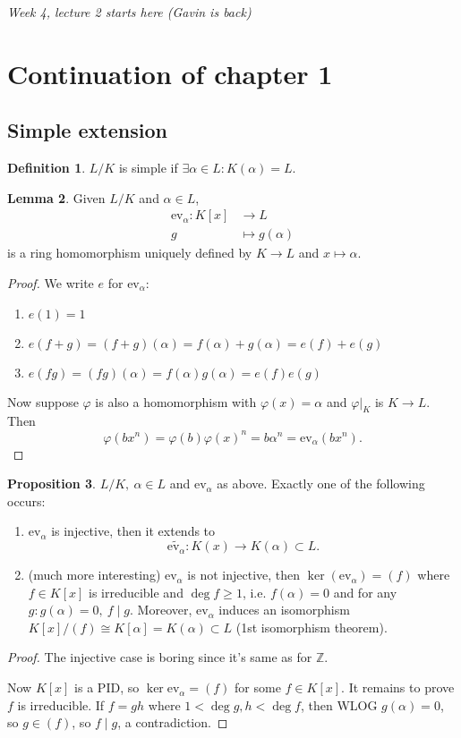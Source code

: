 \documentclass[a4paper]{article}
\newcommand{\Z}{\mathbb Z}
\newcommand{\ev}{\text{ev}_\alpha}
\theoremstyle{definition}
\newtheorem{defn}{Definition}[subsection]
\newtheorem{prop}[defn]{Proposition}
\newtheorem{lemma}[defn]{Lemma}
\begin{document}
\begin{flushright}
\textit{Week 4, lecture 2 starts here (Gavin is back)}
\end{flushright}

\section{Continuation of chapter 1}
\subsection{Simple extension}
\begin{defn}
$L/K$ is simple if $\exists \alpha\in L:K(\alpha)=L$.
\end{defn}
\begin{lemma}
Given $L/K$ and $\alpha\in L$,
\[
\begin{aligned}
\ev : K[x]&\rightarrow L \\
g&\mapsto g(\alpha)
\end{aligned}
\]
is a ring homomorphism uniquely defined by $K\rightarrow L$ and $x\mapsto \alpha$.
\end{lemma}
\begin{proof}
We write $e$ for $\ev$:
\begin{enumerate}
\item $e(1)=1$
\item $e(f+g)=(f+g)(\alpha)=f(\alpha)+g(\alpha)=e(f)+e(g)$
\item $e(fg)=(fg)(\alpha)=f(\alpha)g(\alpha)=e(f)e(g)$
\end{enumerate}
Now suppose $\varphi$ is also a homomorphism with $\varphi(x)=\alpha$ and $\varphi|_K$ is $K\rightarrow L$. Then
\[
\varphi(bx^n)=\varphi(b)\varphi(x)^n=b\alpha^n=\ev(bx^n).
\]
\end{proof}

\begin{prop}
$L/K,\ \alpha\in L$ and $\ev$ as above. Exactly one of the following occurs:
\begin{enumerate}
\item $\ev$ is injective, then it extends to
\[
\widetilde{\ev}:K(x)\rightarrow K(\alpha) \subset L.
\]
\item (much more interesting) $\ev$ is not injective, then $\ker(\ev)=(f)$ where $f\in K[x]$ is irreducible and $\deg f\geq 1$, i.e. $f(\alpha)=0$ and for any $g:g(\alpha)=0,\ f\mid g$. Moreover, $\ev$ induces an isomorphism $K[x]/(f)\cong K[\alpha]=K(\alpha)\subset L$ (1st isomorphism theorem).
\end{enumerate}
\end{prop}
\begin{proof}
The injective case is boring since it's same as for $\Z$.

Now $K[x]$ is a PID, so $\ker\ev=(f)$ for some $f\in K[x]$. It remains to prove $f$ is irreducible. If $f=gh$ where $1<\deg g,h <\deg f$, then WLOG $g(\alpha)=0$, so $g\in (f)$, so $f\mid g$, a contradiction.
\end{proof}
\end{document}
